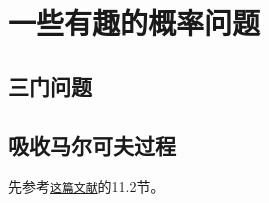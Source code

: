 \chapter{一些有趣的概率问题}
\section{三门问题}

\section{吸收马尔可夫过程}
先参考\href{http://www.dartmouth.edu/~chance/teaching_aids/books_articles/probability_book/Chapter11.pdf}
{\texttt{这篇文献}}的11.2节。

